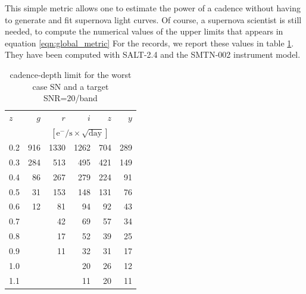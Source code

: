 \documentclass[\docopts]{\docclass}
\begin{document}
This simple metric allows one to estimate the power of a cadence
without having to generate and fit supernova light curves.  Of course,
a supernova scientist is still needed, to compute the numerical values
of the upper limits that appears in equation \ref{eqn:global_metric}
For the records, we report these values in table
\ref{tab:cadence_depth_limit}. They have been computed with SALT-2.4
and the SMTN-002 instrument model.



\begin{table}[t]
\begin{center}
\caption{cadence-depth limit for the worst case SN and a target SNR=20/band}
\label{tab:cadence_depth_limit}
\begin{tabular}{l|rrrrr}
\hline
\hline
    $z$   &      $g$         &       $r$         &     $i$           &      $z$        &      $y$           \\
          &      \multicolumn{5}{c}{$[\mathrm{e^-/s \times \sqrt{day}}]$} \\
\hline
     0.2  &     916 &    1330 &    1262 &     704 &     289   \\
     0.3  &     284 &     513 &     495 &     421 &     149   \\
     0.4  &      86 &     267 &     279 &     224 &      91   \\
     0.5  &      31 &     153 &     148 &     131 &      76   \\
     0.6  &      12 &      81 &      94 &      92 &      43   \\
     0.7  &         &      42 &      69 &      57 &      34   \\
     0.8  &         &      17 &      52 &      39 &      25   \\
     0.9  &         &      11 &      32 &      31 &      17   \\
     1.0  &         &         &      20 &      26 &      12   \\
     1.1  &         &         &      11 &      20 &      11   \\

\hline
\end{tabular}
\end{center}
\end{table}
\end{document}

